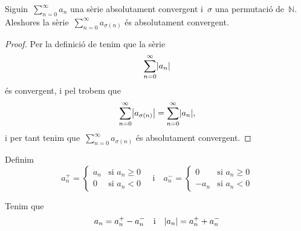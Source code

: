 \documentclass[../../main.tex]{subfiles}
\begin{document}
    \begin{proposition}
        \label{prop:la reordenada d'una sèrie absolutament convergent és absolutament convergent}
        Siguin~\(\sum_{n=0}^{\infty}a_{n}\) una sèrie absolutament convergent i~\(\sigma\) una permutació de~\(\mathbb{N}\).
        Aleshores la sèrie~\(\sum_{n=0}^{\infty}a_{\sigma(n)}\) és absolutament convergent.
        \begin{proof}
            Per la definició de  tenim que la sèrie
            \[
                \sum_{n=0}^{\infty}\abs{a_{n}}
            \]
            és convergent, i pel \corollari{}  trobem que
            \[
                \sum_{n=0}^{\infty}\abs{a_{\sigma(n)}}=\sum_{n=0}^{\infty}\abs{a_{n}},
            \]
            i per tant tenim que~\(\sum_{n=0}^{\infty}a_{\sigma(n)}\) és absolutament convergent.
        \end{proof}
    \end{proposition}
    \begin{notation}
        \label{notation:part positiva d'un nombre}
        \label{notation:part negativa d'un nombre}
        Definim
        \[a^{+}_{n}=\begin{cases}
            a_{n} & \text{si }a_{n}\geq0 \\
            0 & \text{si }a_{n}<0
        \end{cases}\quad\text{i}\quad
        a^{-}_{n}=\begin{cases}
            0 & \text{si }a_{n}\geq0 \\
            -a_{n} & \text{si }a_{n}<0
        \end{cases}\]
    \end{notation}
    \begin{observation}
        \label{obs:sumes de la part positiva i negativa d'un nombre}
        Tenim que
        \[
            a_{n}=a^{+}_{n}-a^{-}_{n}\quad\text{i}\quad\abs{a_{n}}=a^{+}_{n}+a^{-}_{n}
        \]
    \end{observation}
\end{document}
